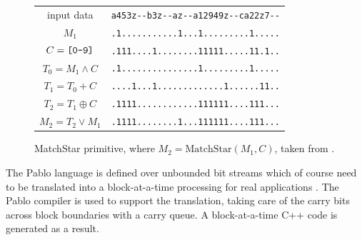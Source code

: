\begin{figure}[tbh]
\begin{center}
\begin{tabular}{cr}\\
input data  & \verb`a453z--b3z--az--a12949z--ca22z7--`\\
$M_1$ & \verb`.1...........1...1.........1.....`\\
$C = \text{\tt [0-9]}$ & \verb`.111....1........11111.....11.1..`\\
$T_0 = M_1 \wedge C$ & \verb`.1...............1.........1.....`\\
$T_1 = T_0 + C$ & \verb`....1...1.............1......11..`\\
$T_2 = T_1 \oplus C$ & \verb`.1111............111111....111...`\\
$M_2 = T_2 \vee M_1$ & \verb`.1111........1...111111....111...`
\end{tabular}
\end{center}
\caption[MatchStar Using Bitstream Addition and Mask]{MatchStar primitive, where $M_2 = \text{MatchStar}(M_1, C)$, taken from \cite{rob_regex}.}
\label{figure:matchstar}
\end{figure}

The Pablo language is defined over unbounded bit streams which of course need to be translated into a block-at-a-time processing for real applications \cite{rob_regex}. The Pablo compiler is used to support the translation, taking care of the carry bits across block boundaries with a carry queue. A block-at-a-time C++ code is generated as a result.


